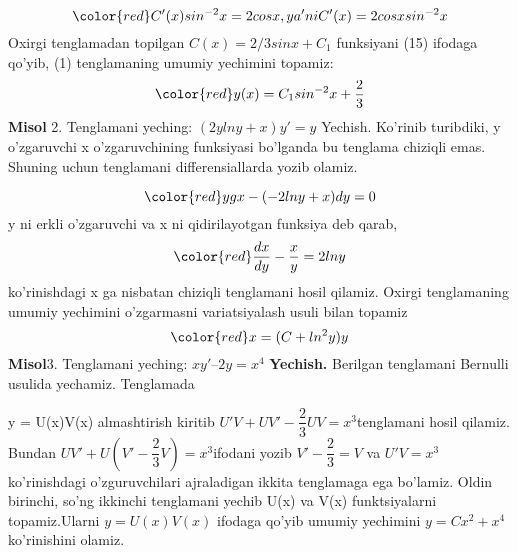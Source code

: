\documentclass{beamer}
\begin{document}
\begin{frame}
\begin{equation}
\color{red} C'(x)sin^{-2}x = 2cosx, ya'ni C'(x) = 2cosx sin^{-2}x
\end{equation}
\quad Oxirgi tenglamadan topilgan $C(x) =2/3sinx+C_{1}$ funksiyani (15) ifodaga qo’yib, (1) tenglamaning umumiy yechimini topamiz:\\
\begin{equation}
\color{red} y(x) = C_{1}sin^{-2}x+\dfrac{2}{3}
\end{equation}
\textbf{Misol} 2. Tenglamani yeching: $(2y lny + x)y' = y$
Yechish. Ko’rinib turibdiki, y o’zgaruvchi x o’zgaruvchining funksiyasi bo’lganda bu tenglama chiziqli emas. Shuning uchun tenglamani differensiallarda yozib olamiz.
\end{frame}
\begin{frame}
\begin{equation}
\color{red} ygx - (-2 lny + x)dy = 0
\end{equation}
y ni erkli o’zgaruvchi va x ni qidirilayotgan funksiya deb qarab,
\begin{equation}
\color{red} \dfrac{dx}{dy}-\dfrac{x}{y}=2lny
\end{equation}
ko’rinishdagi x ga nisbatan chiziqli tenglamani hosil qilamiz. Oxirgi tenglamaning umumiy yechimini o’zgarmasni variatsiyalash usuli bilan topamiz
\begin{equation}
\color{red} x = (C + ln^{2}y)y
\end{equation}
\textbf{Misol}3. Tenglamani yeching: $xy' – 2y = x^4$
\textbf{Yechish.} Berilgan tenglamani Bernulli usulida yechamiz. Tenglamada
\end{frame}
\begin{frame}
y = U(x)V(x) almashtirish kiritib $U'V+UV'-\dfrac{2}{3}UV = x^{3}$tenglamani hosil qilamiz. Bundan $UV'+U(V'-\dfrac{2}{3}V) = x^{3}$ifodani yozib  $V'-\dfrac {2}{3}=V$ va $U'V = x^{3}$ ko’rinishdagi o’zguruvchilari ajraladigan ikkita tenglamaga ega bo’lamiz. Oldin birinchi, so’ng ikkinchi tenglamani yechib U(x) va V(x) funktsiyalarni topamiz.Ularni $y = U(x)V(x)$ ifodaga qo’yib umumiy yechimini $y = Cx^2 + x^4 $ko’rinishini olamiz.
\end{frame}
\end{document}
